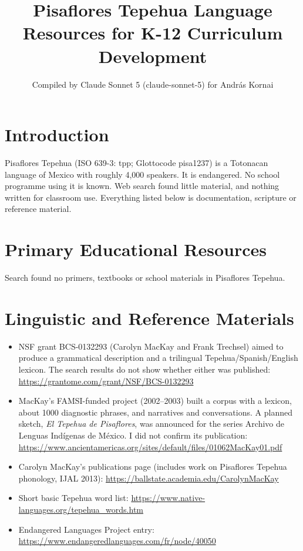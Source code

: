 \documentclass[12pt]{article}
\title{Pisaflores Tepehua Language Resources for K-12 Curriculum Development}
\author{Compiled by Claude Sonnet 5 (claude-sonnet-5) for Andr\'as Kornai}
\date{}
\begin{document}
\maketitle

\section{Introduction}
Pisaflores Tepehua (ISO 639-3: tpp; Glottocode pisa1237) is a Totonacan language of Mexico with roughly 4,000 speakers. It is endangered. No school programme using it is known. Web search found little material, and nothing written for classroom use. Everything listed below is documentation, scripture or reference material.

\section{Primary Educational Resources}
Search found no primers, textbooks or school materials in Pisaflores Tepehua.

\section{Linguistic and Reference Materials}
\begin{itemize}
\item NSF grant BCS-0132293 (Carolyn MacKay and Frank Trechsel) aimed to produce a grammatical description and a trilingual Tepehua/Spanish/English lexicon. The search results do not show whether either was published: \url{https://grantome.com/grant/NSF/BCS-0132293}
\item MacKay's FAMSI-funded project (2002--2003) built a corpus with a lexicon, about 1000 diagnostic phrases, and narratives and conversations. A planned sketch, \emph{El Tepehua de Pisaflores}, was announced for the series Archivo de Lenguas Ind\'igenas de M\'exico. I did not confirm its publication: \url{https://www.ancientamericas.org/sites/default/files/01062MacKay01.pdf}
\item Carolyn MacKay's publications page (includes work on Pisaflores Tepehua phonology, IJAL 2013): \url{https://ballstate.academia.edu/CarolynMacKay}
\item Short basic Tepehua word list: \url{https://www.native-languages.org/tepehua_words.htm}
\item Endangered Languages Project entry: \url{https://www.endangeredlanguages.com/fr/node/40050}
\end{itemize}
\end{document}
